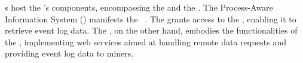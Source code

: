 s host the 's components, encompassing the  and the . 
The Process-Aware Information System () manifests the ~\citep{Dumas.etal/2018:FundamentalsofBPM}. %
%
%
The  grants access to the , enabling it to retrieve event log data. The , on the other hand, embodies the functionalities of the , implementing web services aimed at handling remote data requests and providing event log data to miners. %


